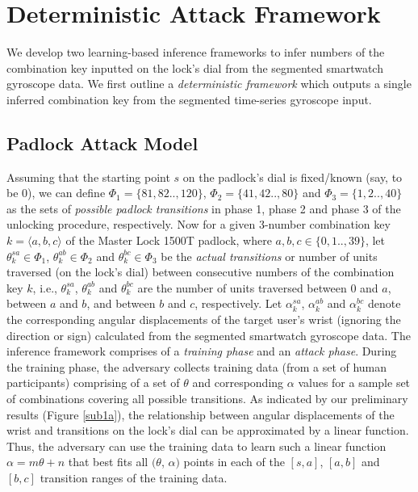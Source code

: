 \documentclass[]{IEEEtran}
\begin{document}
\section{Deterministic Attack Framework}
\label{dattack}
We develop two learning-based inference frameworks to infer numbers of the combination key inputted on the lock's dial from the segmented smartwatch gyroscope data. We first outline a \emph{deterministic framework} which outputs a single inferred combination key from the segmented time-series gyroscope input. 

\subsection{Padlock Attack Model}
\label{detpadlock}
Assuming that the starting point $s$ on the padlock's dial is fixed/known (say, to be 0), we can define $\Phi_{1}=\{81,82..,120\}$, $\Phi_{2}=\{41,42..,80\}$ and $\Phi_{3}=\{1,2..,40\}$ as the sets of \emph{possible padlock transitions} in phase 1, phase 2 and phase 3 of the unlocking procedure, respectively. Now for a given 3-number combination key $k=\langle a,b,c\rangle$ of the Master Lock 1500T padlock, where $a,b,c \in \{0,1..,39\}$, let $\theta^{sa}_k\in \Phi_{1}$, $\theta^{ab}_k\in \Phi_{2}$ and $\theta^{bc}_k\in \Phi_{3}$ be the \emph{actual transitions} or number of units traversed (on the lock's dial) between consecutive numbers of the combination key $k$, i.e., $\theta^{sa}_k$, $\theta^{ab}_k$ and $\theta^{bc}_k$ are the number of units traversed between $0$ and $a$, between $a$ and $b$, and between $b$ and $c$, respectively. 
Let $\alpha^{sa}_k$, $\alpha^{ab}_k$ and $\alpha^{bc}_k$ denote the corresponding angular displacements of the target user's wrist (ignoring the direction or sign) calculated from the segmented smartwatch gyroscope data. The inference framework comprises of a \emph{training phase} and an \emph{attack phase}. During the training phase, the adversary collects training data (from a set of human participants) comprising of a set of $\theta$ and corresponding $\alpha$ values for a sample set of combinations covering all possible transitions. 
As indicated by our preliminary results (Figure \ref{sub1a}), the relationship between angular displacements of the wrist and transitions on the lock's dial can be approximated by a linear function. Thus, the adversary can use the training data to learn such a linear function $\alpha=m\theta+n$ that best fits all $(\theta$, $\alpha)$ points in each of the $[s,a]$, $[a,b]$ and $[b,c]$ transition ranges of the training data. 
\end{document}
